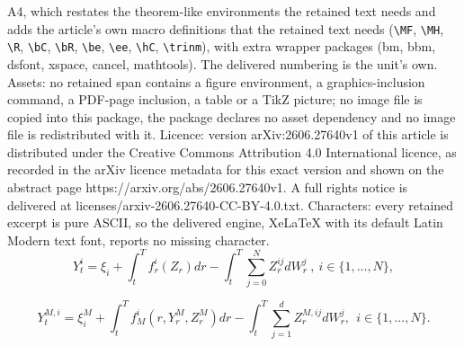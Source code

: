 \documentclass[10pt,a4paper]{amsart}
\begin{document}
A4, which restates the theorem-like environments the retained text needs and adds the article's own macro definitions that the retained text needs (\texttt{\textbackslash MF}, \texttt{\textbackslash MH}, \texttt{\textbackslash R}, \texttt{\textbackslash bC}, \texttt{\textbackslash bR}, \texttt{\textbackslash be}, \texttt{\textbackslash ee}, \texttt{\textbackslash hC}, \texttt{\textbackslash trinm}), with extra wrapper packages (bm, bbm, dsfont, xspace, cancel, mathtools). The delivered numbering is the unit's own. Assets: no retained span contains a figure environment, a graphics-inclusion command, a PDF-page inclusion, a table or a TikZ picture; no image file is copied into this package, the package declares no asset dependency and no image file is redistributed with it. Licence: version arXiv:2606.27640v1 of this article is distributed under the Creative Commons Attribution 4.0 International licence, as recorded in the arXiv licence metadata for this exact version and shown on the abstract page https://arxiv.org/abs/2606.27640v1. A full rights notice is delivered at licenses/arxiv-2606.27640-CC-BY-4.0.txt. Characters: every retained excerpt is pure ASCII, so the delivered engine, XeLaTeX with its default Latin Modern text font, reports no missing character.
\begin{equation}
\label{equ:qBSDE}
Y_{t}^{i} = \xi_{i} + \int_{t}^{T}f_{r}^{i}(Z_{r})dr - \int_{t}^{T}\sum_{j=0}^{N}Z_{r}^{ij}dW_{r}^{j} \ , \ i \in \{1,...,N\},
\end{equation}

\begin{equation}
\label{equ:3.genBSDE}
Y_{t}^{M,i} = \xi_{i}^{M} + \int_{t}^{T}f_{M}^{i}(r,Y_{r}^{M},Z_{r}^{M})dr - \int_{t}^{T}\sum_{j=1}^{d}Z_{r}^{M,ij}dW_{r}^{j}, \ \ i \in \{1,...,N\}.
\end{equation}
\end{document}
